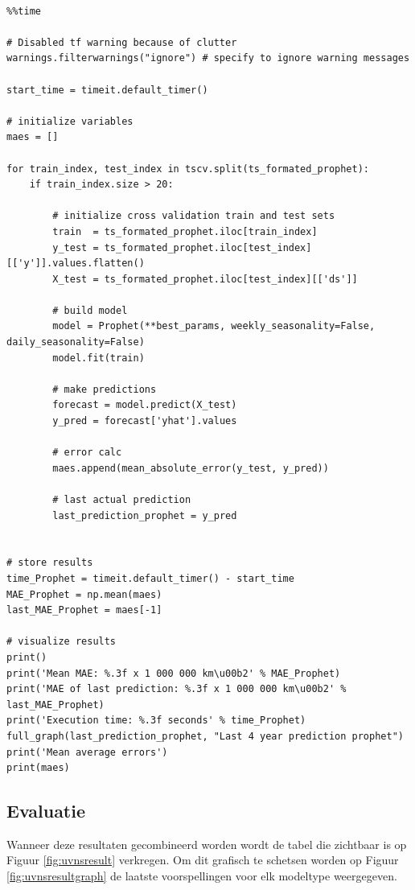 \begin{verbatim}

%%time

# Disabled tf warning because of clutter
warnings.filterwarnings("ignore") # specify to ignore warning messages

start_time = timeit.default_timer()

# initialize variables
maes = []

for train_index, test_index in tscv.split(ts_formated_prophet):
    if train_index.size > 20:  
    
        # initialize cross validation train and test sets
        train  = ts_formated_prophet.iloc[train_index]
        y_test = ts_formated_prophet.iloc[test_index][['y']].values.flatten()
        X_test = ts_formated_prophet.iloc[test_index][['ds']]
        
        # build model
        model = Prophet(**best_params, weekly_seasonality=False, daily_seasonality=False)
        model.fit(train)
        
        # make predictions
        forecast = model.predict(X_test)
        y_pred = forecast['yhat'].values
        
        # error calc
        maes.append(mean_absolute_error(y_test, y_pred))
        
        # last actual prediction 
        last_prediction_prophet = y_pred


# store results
time_Prophet = timeit.default_timer() - start_time
MAE_Prophet = np.mean(maes)
last_MAE_Prophet = maes[-1]

# visualize results
print()
print('Mean MAE: %.3f x 1 000 000 km\u00b2' % MAE_Prophet)
print('MAE of last prediction: %.3f x 1 000 000 km\u00b2' % last_MAE_Prophet)
print('Execution time: %.3f seconds' % time_Prophet)
full_graph(last_prediction_prophet, "Last 4 year prediction prophet")
print('Mean average errors')
print(maes)

\end{verbatim}

\clearpage
\subsection{Evaluatie}

Wanneer deze resultaten gecombineerd worden wordt de tabel die zichtbaar is op Figuur \ref{fig:uvnsresult} verkregen. Om dit grafisch te schetsen worden op Figuur \ref{fig:uvnsresultgraph} de laatste voorspellingen voor elk modeltype weergegeven.

